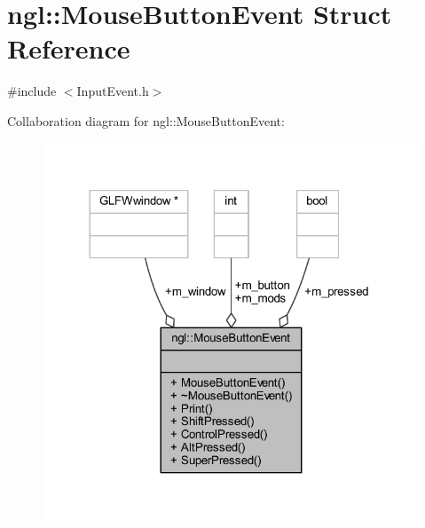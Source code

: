 \hypertarget{structngl_1_1_mouse_button_event}{}\section{ngl\+:\+:Mouse\+Button\+Event Struct Reference}
\label{structngl_1_1_mouse_button_event}


{\ttfamily \#include $<$Input\+Event.\+h$>$}



Collaboration diagram for ngl\+:\+:Mouse\+Button\+Event\+:
\nopagebreak
\begin{figure}[H]
\begin{center}
\leavevmode
\includegraphics[width=317pt]{structngl_1_1_mouse_button_event__coll__graph}
\end{center}
\end{figure}
